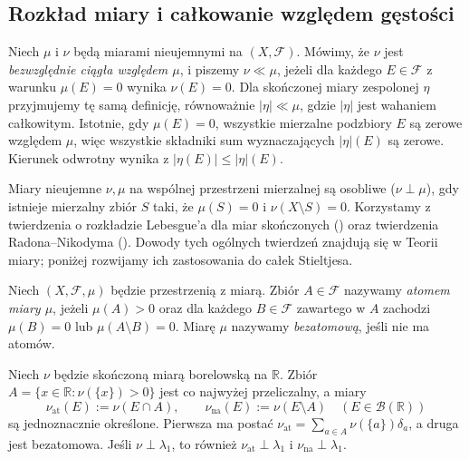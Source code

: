 \subsection*{Rozkład miary i całkowanie względem gęstości}
\begin{definicja}
\label{def:ac-measure-17}
Niech $\mu$ i $\nu$ będą miarami nieujemnymi na $(X,\mathcal F)$.
Mówimy, że $\nu$ jest \emph{bezwzględnie ciągła względem $\mu$},
i piszemy $\nu\ll\mu$, jeżeli dla każdego $E\in\mathcal F$
z warunku $\mu(E)=0$ wynika $\nu(E)=0$.
Dla skończonej miary zespolonej $\eta$ przyjmujemy tę samą definicję,
równoważnie $|\eta|\ll\mu$, gdzie $|\eta|$ jest wahaniem całkowitym. Istotnie, gdy $\mu(E)=0$, wszystkie mierzalne podzbiory $E$ są zerowe względem $\mu$, więc wszystkie składniki sum wyznaczających $|\eta|(E)$ są zerowe. Kierunek odwrotny wynika z $|\eta(E)|\le|\eta|(E)$.
\end{definicja}
Miary nieujemne $\nu,\mu$ na wspólnej przestrzeni mierzalnej są osobliwe ($\nu\perp\mu$), gdy istnieje mierzalny zbiór $S$ taki, że $\mu(S)=0$ i $\nu(X\setminus S)=0$. Korzystamy z twierdzenia o rozkładzie Lebesgue'a dla miar skończonych
()
oraz twierdzenia Radona--Nikodyma
().
Dowody tych ogólnych twierdzeń znajdują się w Teorii miary;
poniżej rozwijamy ich zastosowania do całek Stieltjesa.
\begin{definicja}
\label{def:atom}
Niech $(X,\mathcal F,\mu)$ będzie przestrzenią z miarą.
Zbiór $A\in\mathcal F$ nazywamy \emph{atomem miary $\mu$},
jeżeli $\mu(A)>0$ oraz dla każdego $B\in\mathcal F$
zawartego w $A$ zachodzi $\mu(B)=0$ lub
$\mu(A\setminus B)=0$.
Miarę $\mu$ nazywamy \emph{bezatomową}, jeśli nie ma atomów.
\end{definicja}
\begin{twierdzenie}
\label{thm:atomic-cont-singular-17}
Niech $\nu$ będzie skończoną miarą borelowską na
$\mathbb R$. Zbiór
$A=\{x\in\mathbb R:\nu(\{x\})>0\}$ jest co najwyżej
przeliczalny, a miary
\[
 \nu_{\mathrm{at}}(E):=\nu(E\cap A),\qquad
 \nu_{\mathrm{na}}(E):=\nu(E\setminus A)
 \quad(E\in\mathcal B(\mathbb R))
\]
są jednoznacznie określone. Pierwsza ma postać
$\nu_{\mathrm{at}}=\sum_{a\in A}\nu(\{a\})\delta_a$,
a druga jest bezatomowa. Jeśli $\nu\perp\lambda_1$,
to również $\nu_{\mathrm{at}}\perp\lambda_1$ i
$\nu_{\mathrm{na}}\perp\lambda_1$.
\end{twierdzenie}

